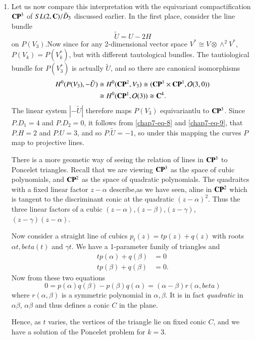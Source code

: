 \medskip
\begin{example*}
~

\begin{enumerate}[]
 \item Let us now compare this interpretation with the equivariant compactification $\mathbf{C}\mathbf{P}^{3}$ of $SL(2, \mathbf{C})/\tilde{D}_{3}$ discussed earlier. In the first place, consider the line bundle
    $$
    \tilde{U}= U-2H
    $$
    on $P(V_{3})$.Now since for any 2-dimensional vector space $V^{*}\cong V \otimes \wedge^{2}V^{*}$, $P(V_{k})=P(V_{k}^{*})$, but with different tautological bundles. The tautiological bundle for $P(V_{3}^{*})$ is actually $\tilde{U}$, and so there are canonical isomorphisms
    \begin{align*}
    H^{0}(P(V_{3}), -\tilde{U}) &\cong H^{0}(\mathbf{C}\mathbf{P}^{2}, V_{3})\cong (\mathbf{C}\mathbf{P}^{1} \times \mathbf{C}\mathbf{P}^{1}, \mathcal{O}(3, 0))\\
       &\cong H^{0}(\mathbf{C}\mathbf{P}^{1}, \mathcal{O}(3))\cong \mathbf{C}^{4}.
    \end{align*}
    The linear system $|-\tilde{U}|$ therefore maps $P(V_{3})$ equivariantlu to $\mathbf{C}\mathbf{P}^{3}$. Since $P.D_{1} = 4$ and $P.D_{2} = 0$, it follows from \eqref{chap7-eq-8} and \eqref{chap7-eq-9}, that $P.H = 2$ and $P.U = 3$, and so $P.\tilde{U} = -1$, so under this mapping the curves $P$ map to projective lines.

    There is a more geometic way of seeing the relation of lines in $\mathbf{C}\mathbf{P}^{3}$ to Poncelet triangles. Recall that we are viewing  $\mathbf{C}\mathbf{P}^{3}$ as the space of cubic polynomials, and $\mathbf{C}\mathbf{P}^{2}$ as the space of quadratic polynomials. The quadraitcs with a fixed linear factor $z-\alpha$ describe,\pageoriginale as we have seen, aline in $\mathbf{C}\mathbf{P}^{2}$ which is tangent to the discriminant conic at the quadratic $(z-\alpha)^{2}$. Thus the three linear factors of a cubic $(z-\alpha)$,$(z-\beta)$,$(z-\gamma)$, $(z-\gamma) (z-\alpha)$.

    Now consider a straight line of cubics $p_{t}(z)=tp(z)+q(z)$ with roots $\alpha{t}, beta(t)$ and $\gamma{t}$. We have a 1-parameter family of triangles and
    \begin{align*}
    tp(\alpha) + q(\beta) &= 0\\
    tp(\beta) +q(\beta) &=0.
    \end{align*}
    Now from these two equations
    $$
    0 = p(\alpha)q(\beta) -p(\beta)q(\alpha)= (\alpha-\beta)r(\alpha, beta)
    $$
    where $r(\alpha, \beta)$ is a symmetric polynomial in $\alpha,\beta$. It is in fact \textit{quadratic} in $\alpha  \beta$, $\alpha \beta$ and thus defines a conic $C$ in the plane.

    Hence, as $t$ varies, the vertices of the triangle lie on fixed conic $C$, and we have a solution of the Poncelet problem for $k=3$.
    \end{enumerate}
\end{example*}

